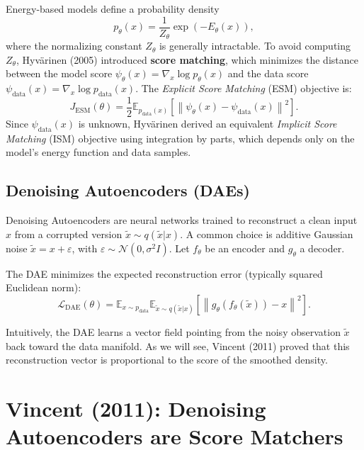 \documentclass[11pt,a4paper]{article}
\begin{document}
Energy-based models define a probability density
\[
p_\theta(x) = \frac{1}{Z_\theta}\exp(-E_\theta(x)),
\]
where the normalizing constant $Z_\theta$ is generally intractable. To avoid computing $Z_\theta$, Hyvärinen (2005) introduced \textbf{score matching}, which minimizes the distance between the model score $\psi_\theta(x) = \nabla_x \log p_\theta(x)$ and the data score $\psi_{\text{data}}(x) = \nabla_x \log p_{\text{data}}(x)$. The \textit{Explicit Score Matching} (ESM) objective is:
\[
J_{\text{ESM}}(\theta) = \frac{1}{2} \mathbb{E}_{p_{\text{data}}(x)} \left[ \left\| \psi_\theta(x) - \psi_{\text{data}}(x) \right\|^2 \right].
\]
Since $\psi_{\text{data}}(x)$ is unknown, Hyvärinen derived an equivalent \textit{Implicit Score Matching} (ISM) objective \cite{hyvarinen2005} using integration by parts, which depends only on the model's energy function and data samples.

\subsection{Denoising Autoencoders (DAEs)}

Denoising Autoencoders are neural networks trained to reconstruct a clean input $x$ from a corrupted version $\tilde{x} \sim q(\tilde{x}|x)$. A common choice is additive Gaussian noise $\tilde{x} = x + \varepsilon$, with $\varepsilon \sim \mathcal{N}(0, \sigma^2 I)$. Let $f_\theta$ be an encoder and $g_\theta$ a decoder.

\begin{tcolorbox}[colback=gray!5!white,colframe=black,left=2pt,right=2pt,top=2pt,bottom=2pt, title={DAE Training Objective}]
The DAE minimizes the expected reconstruction error (typically squared Euclidean norm):
\begin{equation}
    \mathcal{L}_{\text{DAE}}(\theta) = \mathbb{E}_{x \sim p_{\text{data}}} \mathbb{E}_{\tilde{x} \sim q(\tilde{x}|x)} \left[ \left\| g_\theta(f_\theta(\tilde{x})) - x \right\|^2 \right].
\end{equation}
\end{tcolorbox}

Intuitively, the DAE learns a vector field pointing from the noisy observation $\tilde{x}$ back toward the data manifold. As we will see, Vincent (2011) proved that this reconstruction vector is proportional to the score of the smoothed density.

\section{Vincent (2011): Denoising Autoencoders are Score Matchers}
\end{document}
